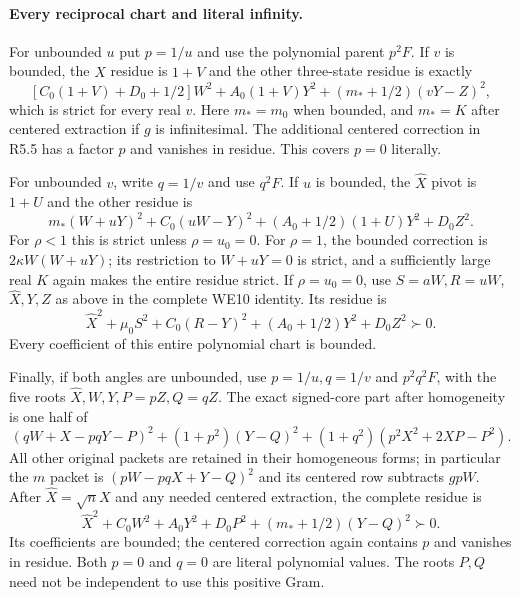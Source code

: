 \paragraph{Every reciprocal chart and literal infinity.}
For unbounded $u$ put $p=1/u$ and use the polynomial parent $p^2F$.
If $v$ is bounded, the $\widehat X$ residue is $1+V$ and the other
three-state residue is exactly
\[
 [C_0(1+V)+D_0+1/2]W^2+A_0(1+V)Y^2
                         +(m_*+1/2)(vY-Z)^2,         \tag{R5.13}
\]
which is strict for every real $v$. Here $m_*=m_0$ when bounded,
and $m_*=K$ after centered extraction if $g$ is infinitesimal.
The additional centered correction in R5.5 has a factor $p$ and
vanishes in residue. This covers $p=0$ literally.

For unbounded $v$, write $q=1/v$ and use $q^2F$. If $u$ is bounded,
the $\widehat X$ pivot is $1+U$ and the other residue is
\[
 m_*(W+uY)^2+C_0(uW-Y)^2+(A_0+1/2)(1+U)Y^2+D_0Z^2.\tag{R5.14}
\]
For $\rho<1$ this is strict unless $\rho=u_0=0$. For $\rho=1$,
the bounded correction is $2\kappa W(W+uY)$; its restriction to
$W+uY=0$ is strict, and a sufficiently large real $K$ again makes
the entire residue strict. If $\rho=u_0=0$, use $S=aW,R=uW$,
$\widehat X,Y,Z$ as above in the complete WE10 identity. Its residue is
\[
 \widehat X^2+\mu_0S^2+C_0(R-Y)^2+(A_0+1/2)Y^2+D_0Z^2\succ0.
                                                               \tag{R5.15}
\]
Every coefficient of this entire polynomial chart is bounded.

Finally, if both angles are unbounded, use $p=1/u,q=1/v$ and
$p^2q^2F$, with the five roots $\widehat X,W,Y,P=pZ,Q=qZ$.
The exact signed-core part after homogeneity is one half of
\[
 (qW+X-pqY-P)^2+(1+p^2)(Y-Q)^2
                    +(1+q^2)(p^2X^2+2XP-P^2).       \tag{R5.16}
\]
All other original packets are retained in their homogeneous forms;
in particular the $m$ packet is $(pW-pqX+Y-Q)^2$ and its centered
row subtracts $gpW$. After $\widehat X=\sqrt nX$ and any needed
centered extraction, the complete residue is
\[
 \widehat X^2+C_0W^2+A_0Y^2+D_0P^2
                                  +(m_*+1/2)(Y-Q)^2\succ0.       \tag{R5.17}
\]
Its coefficients are bounded; the centered correction again contains
$p$ and vanishes in residue. Both $p=0$ and $q=0$ are literal
polynomial values. The roots $P,Q$ need not be independent to use
this positive Gram.

